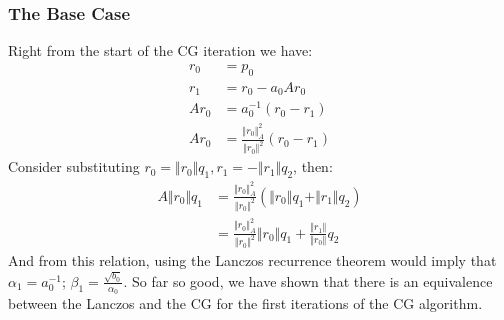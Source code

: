\documentclass[]{article}
\theoremstyle{definition}
\begin{document}
        \subsubsection{The Base Case}
            Right from the start of the CG iteration we have: 
            \begin{align}
                r_0 &= p_0
                \\
                r_1 &= r_0 - a_0Ar_0
                \\
                Ar_0 &= a_0^{-1}(r_0 - r_1)
                \\
                Ar_0 &= \frac{\Vert r_0\Vert_A^2}{\Vert r_0\Vert^2}(r_0 - r_1)
            \end{align}
            Consider substituting $r_0 = \Vert r_0\Vert q_1, r_1 = -\Vert r_1\Vert q_2$, then: 
            \begin{align}
                A\Vert r_0\Vert q_1 
                &= \frac{\Vert r_0\Vert_A^2}{\Vert r_0\Vert^2}\left(
                    \Vert r_0\Vert q_1 + \Vert r_1\Vert q_2
                \right)
                \\
                &= 
                \frac{\Vert r_0\Vert_A^2}{\Vert r_0\Vert^2}\Vert r_0\Vert q_1 + 
                    \frac{\Vert r_1\Vert}{\Vert r_0\Vert} q_2
            \end{align}
            And from this relation, using the Lanczos recurrence theorem would imply that $\alpha_1 = a_0^{-1}$; $\beta_1 = \frac{\sqrt{b_0}}{\alpha_0}$. So far so good, we have shown that there is an equivalence between the Lanczos and the CG for the first iterations of the CG algorithm. 
\end{document}
